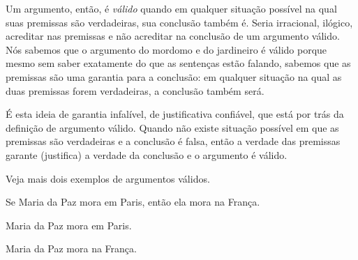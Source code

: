 Um argumento, então, é \emph{válido} quando em qualquer situação possível na qual suas premissas são verdadeiras, sua conclusão também é.
Seria irracional, ilógico, acreditar nas premissas e não acreditar na conclusão de um argumento válido.
Nós sabemos que o argumento do mordomo e do jardineiro é válido porque mesmo sem saber exatamente do que as sentenças estão falando, sabemos que as premissas são uma garantia para a conclusão:
em qualquer situação na qual as duas premissas forem verdadeiras, a conclusão também será.

É esta ideia de garantia infalível, de justificativa confiável, que está por trás da definição de argumento válido.
Quando não existe situação possível em que as premissas são verdadeiras e a conclusão é falsa, então a verdade das premissas garante (justifica) a verdade da conclusão e o argumento é válido.

Veja mais dois exemplos de argumentos válidos.
\begin{earg}
	\item[] Se Maria da Paz mora em Paris, então ela mora na França.
	\item[] Maria da Paz mora em Paris.
	\item[\therefore] Maria da Paz mora na França.
	\label{ValidoMaria}
\end{earg}

